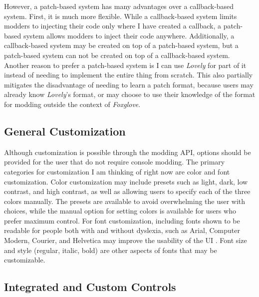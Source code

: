 \documentclass[10pt,twocolumn]{article}
\begin{document}
However, a patch-based system has many advantages over a callback-based system.
First, it is much more flexible. While a callback-based system limits modders to
injecting their code only where I have created a callback, a patch-based system
allows modders to inject their code anywhere. Additionally, a callback-based
system may be created on top of a patch-based system, but a patch-based system
can not be created on top of a callback-based system. Another reason to prefer a
patch-based system is I can use \textit{Lovely} for part of it
instead of needing to
implement the entire thing from scratch. This also partially mitigates the
disadvantage of needing to learn a patch format, because users may already know
\textit{Lovely}'s format,
or may choose to use their knowledge of the format for modding
outside the context of \textit{Foxglove}.

\subsection{General Customization}

Although customization is possible through the modding API, options should be
provided for the user that do not require console modding. The primary
categories for customization I am thinking of right now are color and font
customization. Color customization may
include presets such as light, dark, low contrast, and high contrast, as well as
allowing users to specify each of the three colors manually. The presets are
available to avoid overwhelming the user with choices, while the manual option
for setting colors is available for users who prefer maximum control. For font
customization, including fonts shown to be readable for people both with and
without dyslexia, such as Arial, Computer Modern, Courier, and Helvetica may
improve the usability of the UI \cite{rello_effect_2016}. Font size and style
(regular, italic, bold) are other aspects of fonts that may be customizable.

\subsection{Integrated and Custom Controls}
\end{document}
